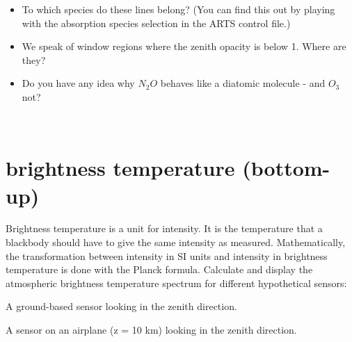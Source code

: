 \documentclass[paper=a4, fontsize=11pt]{scrartcl} %
\begin{document}
\begin{itemize}
	\item To which species do these lines belong? (You can find this out by playing with the absorption species selection in the ARTS control file.)

	\item We speak of window regions where the zenith opacity is below 1. Where are they?

	\item Do you have any idea why $N_{2}O$ behaves like a diatomic molecule - and $O_{3}$ not?

\end{itemize}

\ \\
\section{brightness temperature (bottom-up)}

Brightness temperature is a unit for intensity. It is the temperature that a blackbody should have to give the same intensity as measured. Mathematically, the transformation between intensity in SI units and intensity in brightness temperature is done with the Planck formula. Calculate and display the atmospheric brightness temperature spectrum for different hypothetical sensors:

\begin{compactenum}[a)]
\item A ground-based sensor looking in the zenith direction.
\item A sensor on an airplane (z = 10 km) looking in the zenith direction. 
\end{compactenum}
\end{document}

